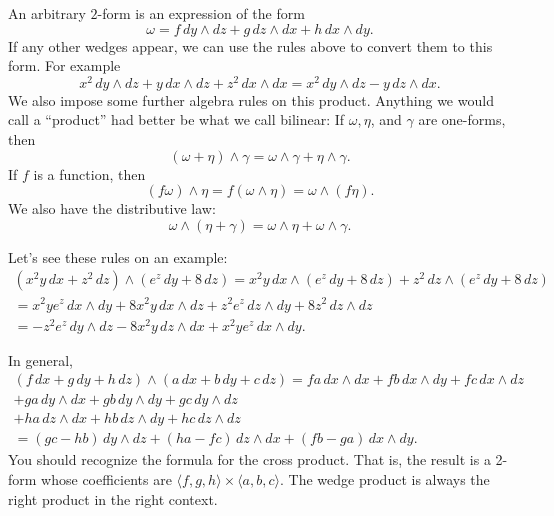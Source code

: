 \documentclass[12pt]{article}
\begin{document}
An arbitrary $2$-form is an expression of the form
\[
\omega = 
f\, dy \wedge dz + 
g\, dz \wedge dx +
h\, dx \wedge dy .
\]
If any other wedges appear, we can use the rules above to convert them to this
form.  For example
\[
x^2 \, dy \wedge dz + 
y \, dx \wedge dz +
z^2\, dx \wedge dx 
=
x^2 \, dy \wedge dz - y \, dz \wedge dx .
\]
We also impose some further algebra rules on this product.  Anything we would
call a ``product'' had better be
what we call bilinear:  If $\omega, \eta$, and $\gamma$ are one-forms, then
\begin{equation*}
(\omega + \eta) \wedge \gamma
=
\omega \wedge \gamma
+
\eta \wedge \gamma .
\end{equation*}
If $f$ is a function, then
\begin{equation*}
(f \omega) \wedge \eta =
f (\omega \wedge \eta) =
\omega \wedge ( f \eta) .
\end{equation*}
We also have the distributive law:
\begin{equation*}
\omega \wedge (\eta + \gamma)
=
\omega \wedge \eta
+
\omega \wedge \gamma .
\end{equation*}

Let's see these rules on an example:
\begin{multline*}
( x^2 y \, dx + z^2 \, dz) \wedge (e^z \, dy + 8 \, dz)
=
x^2 y \, dx \wedge (e^z \, dy + 8 \, dz)
+
z^2 \, dz \wedge (e^z \, dy + 8 \, dz)
\\
=
x^2 y e^z \, dx \wedge dy
+
8 x^2 y \, dx \wedge dz
+
z^2 e^z \, dz \wedge dy
+
8 z^2 \, dz \wedge dz
\\
=
- z^2 e^z \, dy \wedge dz
-
8 x^2 y \, dz \wedge dx
+
x^2 y e^z \, dx \wedge dy .
\end{multline*}

In general,
\begin{multline*}
(f\, dx + g\, dy + h \, dz) \wedge
(a\, dx + b\, dy + c \, dz)
=
fa\, dx \wedge dx +
fb\, dx \wedge dy +
fc\, dx \wedge dz
\\
+
ga\, dy \wedge dx +
gb\, dy \wedge dy +
gc\, dy \wedge dz 
\\
+
ha\, dz \wedge dx +
hb\, dz \wedge dy +
hc\, dz \wedge dz
\\
=
(gc-hb)\, dy \wedge dz +
(ha-fc)\, dz \wedge dx +
(fb - ga) \, dx \wedge dy .
\end{multline*}
You should recognize the formula for the cross product.  That is,
the result is a 2-form whose coefficients are
$\langle f,g,h \rangle \times
\langle a,b,c \rangle$.
The wedge product
is always the right product in the right context.
\end{document}
